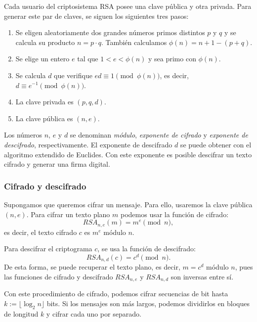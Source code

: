 Cada usuario del criptosistema RSA posee una clave pública y otra privada. Para generar este par de claves, se siguen los siguientes tres pasos:

\begin{enumerate}
    \item Se eligen aleatoriamente dos grandes números primos distintos $p$ y $q$ y se calcula su producto $n = p \cdot q$. También calculamos $\phi(n) = n + 1 - (p + q)$.
    \item Se elige un entero $e$ tal que $1 < e < \phi(n)$ y sea primo con $\phi(n)$.
    \item Se calcula $d$ que verifique $ed \equiv 1 \pmod{\phi(n)}$, es decir, $d \equiv e^{-1} \pmod{\phi(n)}$. 
    \item La clave privada es $(p, q, d)$.
    \item La clave pública es $(n, e)$.
\end{enumerate}

Los números $n$, $e$ y $d$ se denominan \emph{módulo}, \emph{exponente de cifrado} y \emph{exponente de descifrado}, respectivamente. El exponente de descifrado $d$ se puede obtener con el algoritmo extendido de Euclides. Con este exponente es posible descifrar un texto cifrado y generar una firma digital.

\subsubsection{Cifrado y descifrado}

Supongamos que queremos cifrar un mensaje. Para ello, usaremos la clave pública $(n, e)$. Para cifrar un texto plano $m$ podemos usar la función de cifrado:
\[
    RSA_{n, e}(m) = m^e \pmod{n},
\]
es decir, el texto cifrado $c$ es $m^e$ módulo $n$.

Para descifrar el criptograma $c$, se usa la función de descifrado:
\[
    RSA_{n, d}(c) = c^d \pmod{n}.
\]
De esta forma, se puede recuperar el texto plano, es decir, $m = c^d$ módulo $n$, pues las funciones de cifrado y descifrado $RSA_{n, e}$ y $RSA_{n, d}$ son inversas entre sí.

Con este procedimiento de cifrado, podemos cifrar secuencias de bit hasta $k := \lfloor \log_2{n} \rfloor$ bits. Si los mensajes son más largos, podemos dividirlos en bloques de longitud $k$ y cifrar cada uno por separado.

